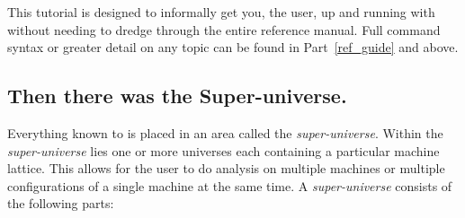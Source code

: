 This tutorial is designed to informally get you, the user, up and
running with \tao without needing to dredge through the entire
reference manual. Full command syntax or greater detail on any topic
can be found in Part~\ref{ref_guide} and above.

\subsection{Then there was the Super-universe.}

Everything known to \tao is placed in an area called the
\textit{super-universe}. Within the \textit{super-universe} lies one
or more universes each containing a particular machine lattice. This
allows for the user to do analysis on multiple machines or multiple
configurations of a single machine at the same time. A
\textit{super-universe} consists of the following parts:

